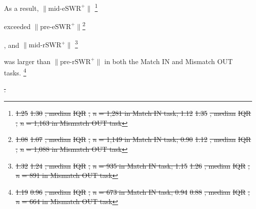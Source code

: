 \documentclass[final,3p,times,twocolumn]{elsarticle}
\providecommand{\DIFdeltex}[1]{{\protect\color{red}\sout{#1}}}                      %
\providecommand{\DIFaddend}{} %
\providecommand{\DIFdelbegin}{} %
\providecommand{\DIFdelend}{} %
\providecommand{\DIFdel}[1]{\texorpdfstring{\DIFdeltex{#1}}{}} %
\newcommand{\DIFscaledelfig}{0.5}
\newlength{\DIFdelgraphicswidth} %
\newlength{\DIFdelgraphicsheight} %
\newcommand{\DIFdelincludegraphics}[2][]{%
\sbox{\DIFdelgraphicsbox}{\DIFOincludegraphics[#1]{#2}}%
\settoboxwidth{\DIFdelgraphicswidth}{\DIFdelgraphicsbox} %
\settoboxtotalheight{\DIFdelgraphicsheight}{\DIFdelgraphicsbox} %
\scalebox{\DIFscaledelfig}{%
\parbox[b]{\DIFdelgraphicswidth}{\usebox{\DIFdelgraphicsbox}\\[-\baselineskip] \rule{\DIFdelgraphicswidth}{0em}}\llap{\resizebox{\DIFdelgraphicswidth}{\DIFdelgraphicsheight}{%
\setlength{\unitlength}{\DIFdelgraphicswidth}%
\begin{picture}(1,1)%
\thicklines\linethickness{2pt} %
{\color[rgb]{1,0,0}\put(0,0){\framebox(1,1){}}}%
{\color[rgb]{1,0,0}\put(0,0){\line( 1,1){1}}}%
{\color[rgb]{1,0,0}\put(0,1){\line(1,-1){1}}}%
\end{picture}%
}\hspace*{3pt}}} %
} %
\DeclareRobustCommand{\DIFaddend}{\DIFOaddend \let\includegraphics\DIFOincludegraphics} %
\DeclareRobustCommand{\DIFdelbegin}{\DIFOdelbegin \let\includegraphics\DIFdelincludegraphics} %
\DeclareRobustCommand{\DIFdelend}{\DIFOaddend \let\includegraphics\DIFOincludegraphics} %
\begin{document}
\DIFaddend As a result, $\mathrm{\lVert \text{mid-eSWR}^+ \rVert}$ \DIFdelbegin \footnote{\DIFdel{1.25 }%
\DIFdel{1.30}%
\DIFdel{, median }%
\DIFdel{IQR}%
\DIFdel{, }\textit{\DIFdel{n}} %
\DIFdel{= 1,281 in Match IN task; 1.12 }%
\DIFdel{1.35}%
\DIFdel{, median }%
\DIFdel{IQR}%
\DIFdel{, }\textit{\DIFdel{n}} %
\DIFdel{= 1,163 in Mismatch OUT task}} %
\addtocounter{footnote}{-1}%
\DIFdelend exceeded $\mathrm{\lVert \text{pre-eSWR}^+ \rVert}$\DIFdelbegin \footnote{\DIFdel{1.08 }%
\DIFdel{1.07}%
\DIFdel{, median }%
\DIFdel{IQR}%
\DIFdel{, }\textit{\DIFdel{n}} %
\DIFdel{= 1,149 in Match IN task; 0.90 }%
\DIFdel{1.12}%
\DIFdel{, median }%
\DIFdel{IQR}%
\DIFdel{, }\textit{\DIFdel{n}} %
\DIFdel{= 1,088 in Mismatch OUT task}}%
\addtocounter{footnote}{-1}%
\DIFdelend , and $\mathrm{\lVert \text{mid-rSWR}^+ \rVert}$ \DIFdelbegin \footnote{\DIFdel{1.32 }%
\DIFdel{1.24}%
\DIFdel{, median }%
\DIFdel{IQR}%
\DIFdel{, }\textit{\DIFdel{n}} %
\DIFdel{= 935 in Match IN task; 1.15 }%
\DIFdel{1.26}%
\DIFdel{, median }%
\DIFdel{IQR}%
\DIFdel{, }\textit{\DIFdel{n}} %
\DIFdel{= 891 in Mismatch OUT task}} %
\addtocounter{footnote}{-1}%
\DIFdelend was larger than $\mathrm{\lVert \text{pre-rSWR}^+ \rVert}$ in both the Match IN and Mismatch OUT tasks.
\DIFdelbegin \footnote{\DIFdel{1.19 }%
\DIFdel{0.96}%
\DIFdel{, median }%
\DIFdel{IQR}%
\DIFdel{, }\textit{\DIFdel{n}} %
\DIFdel{= 673 in Match IN task; 0.94 }%
\DIFdel{0.88}%
\DIFdel{, median }%
\DIFdel{IQR}%
\DIFdel{, }\textit{\DIFdel{n}} %
\DIFdel{= 664 in Mismatch OUT task}}%
\addtocounter{footnote}{-1}%
\DIFdel{.
}\DIFdelend 
\end{document}
